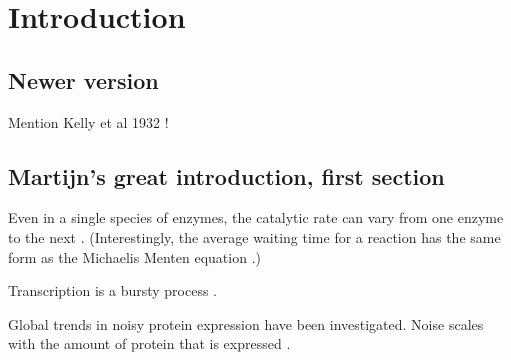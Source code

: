 \chapter*{Introduction}
\label{chapter:introduction}






\section*{Newer version}

Mention Kelly et al 1932 \cite{Kelly1932}!


\section{Martijn's great introduction, first section}


Even in a single species of enzymes, the catalytic rate can vary from one enzyme to the next \cite{Lu1998}. (Interestingly, the average waiting time for a reaction has the same form as the Michaelis Menten equation \cite{Xie2013}.)

Transcription is a bursty process \cite{Golding2005}. 

Global trends in noisy protein expression have been investigated. 
Noise scales with the amount of protein that is expressed \cite{Bar-Even2006}.

